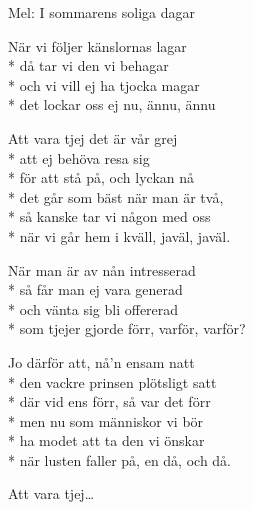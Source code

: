 \begin{SongText}
    \begin{SongInfo}
        Mel: I sommarens soliga dagar
    \end{SongInfo}
    \begin{SongVerse}
        När vi följer känslornas lagar\\*%
        då tar vi den vi behagar\\*%
        och vi vill ej ha tjocka magar\\*%
        det lockar oss ej nu, ännu, ännu
    \end{SongVerse}
    \begin{SongVerse}
        Att vara tjej det är vår grej\\*%
        att ej behöva resa sig\\*%
        för att stå på, och lyckan nå\\*%
        det går som bäst när man är två,\\*%
        så kanske tar vi någon med oss\\*%
        när vi går hem i kväll, javäl, javäl.
    \end{SongVerse}
    \begin{SongVerse}
        När man är av nån intresserad\\*%
        så får man ej vara generad\\*%
        och vänta sig bli offererad\\*%
        som tjejer gjorde förr, varför, varför?
    \end{SongVerse}
    \begin{SongVerse}
        Jo därför att, nå’n ensam natt\\*%
        den vackre prinsen plötsligt satt\\*%
        där vid ens förr, så var det förr\\*%
        men nu som människor vi bör\\*%
        ha modet att ta den vi önskar\\*%
        när lusten faller på, en då, och då.
    \end{SongVerse}
    \begin{SongVerse}
        Att vara tjej…
    \end{SongVerse}
\end{SongText}
